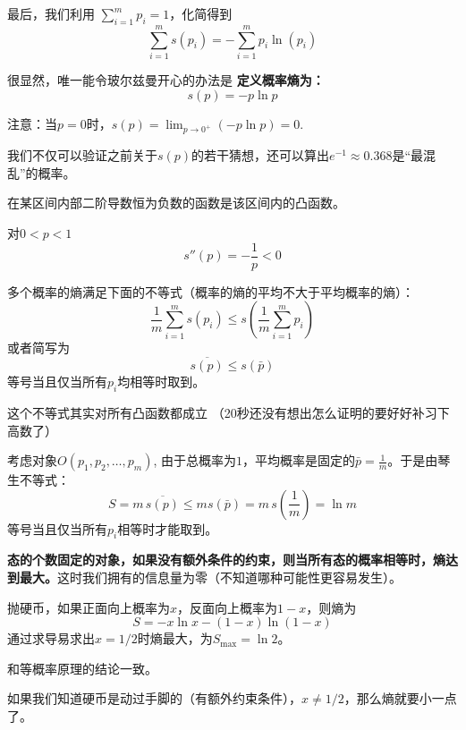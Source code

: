 \documentclass[CJK]{beamer}
\begin{document}
\begin{frame}
\bch
最后，我们利用 $\sum_{i=1}^m p_i = 1$，化简得到
$$\sum_{i=1}^m s(p_i) = -\sum_{i=1}^m p_i \ln (p_i) $$

很显然，唯一能令玻尔兹曼开心的办法是{\blue \bf
定义概率熵为：
$$s(p) = - p \ln p$$
}

\skiplines

{\small 注意：当$p=0$时，$s(p) = \lim_{p\rightarrow 0^+} (-p\ln p) = 0$.


我们不仅可以验证之前关于$s(p)$的若干猜想，还可以算出$e^{-1} \approx 0.368$是“最混乱”的概率。
}


\ech
\end{frame}



\begin{frame}
\bch
{}
\emini
{}
在某区间内部二阶导数恒为负数的函数是该区间内的凸函数。

对$0<p<1$
$$s''(p)  = -\frac{1}{p}<0$$
\emini
\ech
\end{frame}


\begin{frame}
\bch
多个概率的熵满足下面的不等式（{\blue 概率的熵的平均不大于平均概率的熵}）：
$$\frac{1}{m}\sum_{i=1}^m s(p_i) \le  s\left(\frac{1}{m}\sum_{i=1}^m p_i\right)$$
或者简写为{\blue
$$\overline{s(p)} \le s(\bar{p})$$
等号当且仅当所有$p_i$均相等时取到}。


\skiplines

这个不等式其实对所有凸函数都成立 （20秒还没有想出怎么证明的要好好补习下高数了\bye）
\ech
\end{frame}


\begin{frame}
\bch
考虑对象$O(p_1, p_2,\ldots, p_m)$, 由于总概率为$1$，平均概率是固定的$\bar{p} =  \frac{1}{m}$。于是由琴生不等式：
$$ S = m\, \overline{s(p)} \le m s(\bar{p}) = m\, s\left(\frac{1}{m}\right) = \ln m$$
等号当且仅当所有$p_i$相等时才能取到。

\skipline

{\bf \blue 态的个数固定的对象，如果没有额外条件的约束，则当所有态的概率相等时，熵达到最大。}这时我们拥有的信息量为零（不知道哪种可能性更容易发生）。

\ech
\end{frame}

\begin{frame}
\bch

\emini
{}
抛硬币，如果正面向上概率为$x$，反面向上概率为$1-x$，则熵为
$$S = -x\ln x - (1-x)\ln (1-x)$$
通过求导易求出$x = 1/2$时熵最大，为$S_{\max} = \ln 2$。

和等概率原理的结论一致。
\emini

\skiplines

如果我们知道硬币是动过手脚的（有额外约束条件），$x\ne 1/2$，那么熵就要小一点了。
\ech
\end{frame}
\end{document}
